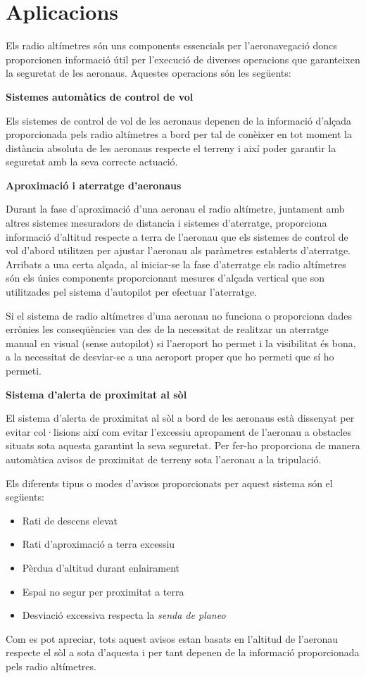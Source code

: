 
\section{Aplicacions}

Els radio altímetres són uns components essencials per l'aeronavegació doncs proporcionen informació útil per l'execució de diverses operacions que garanteixen la seguretat de les aeronaus. Aquestes operacions són les següents:

\textbf{Sistemes automàtics de control de vol}

Els sistemes de control de vol de les aeronaus depenen de la informació d'alçada proporcionada pels radio altímetres a bord per tal de conèixer en tot moment la distància absoluta de les aeronaus respecte el terreny i així poder garantir la seguretat amb la seva correcte actuació.

\textbf{Aproximació i aterratge d'aeronaus}

Durant la fase d'aproximació d'una aeronau el radio altímetre, juntament amb altres sistemes mesuradors de distancia i sistemes d'aterratge, proporciona informació d'altitud respecte a terra de l'aeronau que els sistemes de control de vol d'abord utilitzen per ajustar l'aeronau als paràmetres establerts d'aterratge. Arribats a una certa alçada, al iniciar-se la fase d'aterratge els radio altímetres són els únics components proporcionant mesures d'alçada vertical que son utilitzades pel sistema d'autopilot per efectuar l'aterratge.  

Si el sistema de radio altímetres d'una aeronau no funciona o proporciona dades errònies les conseqüències van des de la necessitat de realitzar un aterratge manual en visual (sense autopilot) si l'aeroport ho permet i la visibilitat és bona, a la necessitat de desviar-se a una aeroport proper que ho permeti que sí ho permeti. 

\textbf{Sistema d'alerta de proximitat al sòl}

El sistema d'alerta de proximitat al sòl a bord de les aeronaus està dissenyat per evitar col·lisions així com evitar l'excessiu apropament de l'aeronau a obstacles situats sota aquesta garantint la seva seguretat. Per fer-ho proporciona de manera automàtica avisos de proximitat de terreny sota l'aeronau a la tripulació.  

Els diferents tipus o modes d'avisos proporcionats per aquest sistema són el següents:
\begin{multicols}{2}
\begin{itemize}
\item Rati de descens elevat
\item Rati d'aproximació a terra excessiu
\item Pèrdua d'altitud durant enlairament
\item Espai no segur per proximitat a terra
\item Desviació excessiva respecta la \textit{senda de planeo}
\end{itemize}
\end{multicols}
Com es pot apreciar, tots aquest avisos estan basats en l'altitud de l'aeronau respecte el sòl a sota d'aquesta i per tant depenen de la informació proporcionada pels radio altímetres. 


